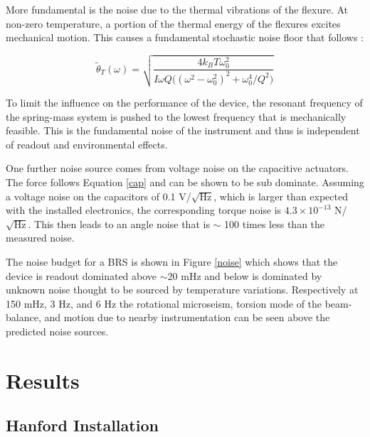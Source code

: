\documentclass [12pt, proquest]{uwthesis}[2019]
\begin{document}
More fundamental is the noise due to the thermal vibrations of the flexure. At non-zero temperature, a portion of the thermal energy of the flexures excites mechanical motion. This causes a fundamental stochastic noise floor that follows \cite{thermal}:

\begin{equation}
\tilde\theta_T(\omega)=\sqrt{\frac{4 k_B T \omega_0^2}{I \omega Q\big((\omega^2-\omega_0^2)^2+\omega_0^4/Q^2\big)}}
\end{equation}

To limit the influence on the performance of the device, the resonant frequency of the spring-mass system is pushed to the lowest frequency that is mechanically feasible. This is the fundamental noise of the instrument and thus is independent of readout and environmental effects.

 One further noise source comes from voltage noise on the capacitive actuators. The force follows Equation \ref{cap} and can be shown to be sub dominate. Assuming a voltage noise on the capacitors of 0.1 V/$\sqrt{\text{Hz}}$, which is larger than expected with the installed electronics, the corresponding torque noise is $4.3 \times 10^{-13}$ N/$\sqrt{\text{Hz}}$. This then leads to an angle noise that is $\sim$ 100 times less than the measured noise.

 The noise budget for a BRS is shown in Figure \ref{noise} which shows that the device is readout dominated above $\sim$20 mHz and below is dominated by unknown noise thought to be sourced by temperature variations. Respectively at 150 mHz, 3 Hz, and 6 Hz the rotational microseism, torsion mode of the beam-balance, and motion due to nearby instrumentation can be seen above the predicted noise sources.

\section{Results}\label{results}
\subsection{Hanford Installation} \label{BRS_Hanford}
\end{document}

